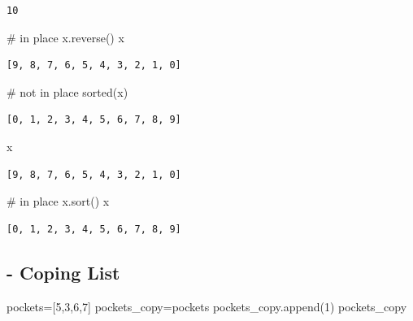 \documentclass[
  letterpaper,
  DIV=11,
  numbers=noendperiod]{scrreprt}
\newenvironment{Shaded}{\begin{snugshade}}{\end{snugshade}}
\newcommand{\BuiltInTok}[1]{\textcolor[rgb]{0.00,0.23,0.31}{#1}}
\newcommand{\CommentTok}[1]{\textcolor[rgb]{0.37,0.37,0.37}{#1}}
\newcommand{\DecValTok}[1]{\textcolor[rgb]{0.68,0.00,0.00}{#1}}
\newcommand{\NormalTok}[1]{\textcolor[rgb]{0.00,0.23,0.31}{#1}}
\newcommand{\OperatorTok}[1]{\textcolor[rgb]{0.37,0.37,0.37}{#1}}
\begin{document}
\begin{verbatim}
10
\end{verbatim}

\begin{Shaded}
\begin{Highlighting}[]
\CommentTok{\# in place}
\NormalTok{x.reverse()}
\NormalTok{x}
\end{Highlighting}
\end{Shaded}

\begin{verbatim}
[9, 8, 7, 6, 5, 4, 3, 2, 1, 0]
\end{verbatim}

\begin{Shaded}
\begin{Highlighting}[]
\CommentTok{\# not in place}
\BuiltInTok{sorted}\NormalTok{(x)}
\end{Highlighting}
\end{Shaded}

\begin{verbatim}
[0, 1, 2, 3, 4, 5, 6, 7, 8, 9]
\end{verbatim}

\begin{Shaded}
\begin{Highlighting}[]
\NormalTok{x}
\end{Highlighting}
\end{Shaded}

\begin{verbatim}
[9, 8, 7, 6, 5, 4, 3, 2, 1, 0]
\end{verbatim}

\begin{Shaded}
\begin{Highlighting}[]
\CommentTok{\# in place}
\NormalTok{x.sort()}
\NormalTok{x}
\end{Highlighting}
\end{Shaded}

\begin{verbatim}
[0, 1, 2, 3, 4, 5, 6, 7, 8, 9]
\end{verbatim}

\subsection{- Coping List}\label{coping-list}

\begin{Shaded}
\begin{Highlighting}[]
\NormalTok{pockets}\OperatorTok{=}\NormalTok{[}\DecValTok{5}\NormalTok{,}\DecValTok{3}\NormalTok{,}\DecValTok{6}\NormalTok{,}\DecValTok{7}\NormalTok{]}
\NormalTok{pockets\_copy}\OperatorTok{=}\NormalTok{pockets}
\NormalTok{pockets\_copy.append(}\DecValTok{1}\NormalTok{)}
\NormalTok{pockets\_copy}
\end{Highlighting}
\end{Shaded}
\end{document}
